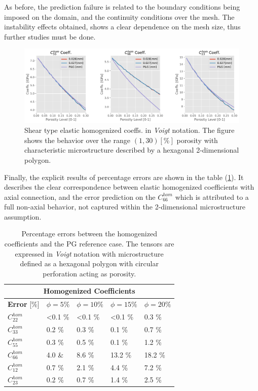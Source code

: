 As before, the prediction failure is related to the boundary conditions being imposed on the domain, and the continuity conditions over the mesh. The instability effects obtained, shows a clear dependence on the mesh size, thus further studies must be done.
\begin{figure}[!h]
	\centering
	\includegraphics[scale=.5]{images/CellsProb/CellProb_OthersHomCoeffsCircularHexa.pdf}
	\caption{Shear type elastic homogenized coeffs. in \textit{Voigt} notation. The figure shows the behavior over the range $(1,30) [\%]$ porosity with characteristic microstructure described by a hexagonal 2-dimensional polygon.}
	\label{OtherHomoCoeffsHexa}
\end{figure}
Finally, the explicit results of percentage errors are shown in the table (\ref{HomCoeffHexaTable}). It describes the clear correspondence between elastic homogenized coefficients with axial connection, and the error prediction on the $C_{66}^{hom}$ which is attributed to a full non-axial behavior, not captured within the 2-dimensional microstructure assumption.

\begin{table}[!h]

\centering
    \begin{tabular}{ |p{2.2cm}||p{2cm}|p{2cm}|p{2cm}|p{2cm}| }
    \hline
    \multicolumn{5}{|c|}{\textbf{Homogenized Coefficients}} \\
    \hline
    \textbf{Error} [\%] & $\phi = 5 \%$ & $\phi = 10 \%$ & $\phi = 15 \%$ & $\phi = 20 \%$ \\
    \hline
    $C^{hom}_{22}$ & <0.1 \% & <0.1 \% & <0.1 \% & 0.3 \% \\
    $C^{hom}_{33}$ & 0.2 \% & 0.3 \% & 0.1 \% & 0.7 \% \\
    $C^{hom}_{55}$ & 0.3 \% & 0.5 \% & 0.1 \% & 1.2 \% \\
    $C^{hom}_{66}$ & 4.0 \& & 8.6 \% & 13.2 \% & 18.2 \% \\
    $C^{hom}_{12}$ & 0.7 \% & 2.1 \% & 4.4 \% & 7.2 \% \\
    $C^{hom}_{23}$ & 0.2 \% & 0.7 \% & 1.4 \% & 2.5 \% \\
    \hline
    \end{tabular}
    \caption{Percentage errors between the homogenized coefficients and the PG reference case. The tensors are expressed in \textit{Voigt} notation with microstructure defined as a hexagonal polygon with circular perforation acting as porosity.}
    \label{HomCoeffHexaTable}
\end{table}

